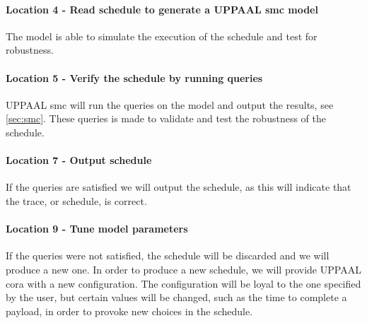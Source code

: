 \paragraph{Location 4 - Read schedule to generate a UPPAAL \gls{smc} model}
The model is able to simulate the execution of the schedule and test for robustness.

\paragraph{Location 5 - Verify the schedule by running queries} 
UPPAAL \gls{smc} will run the queries on the model and output the results, see \cref{sec:smc}. 
These queries is made to validate and test the robustness of the schedule.

\paragraph{Location 7 - Output schedule} 
If the queries are satisfied we will output the schedule, as this will indicate that the trace, or schedule, is correct.

\paragraph{Location 9 - Tune model parameters} 
If the queries were not satisfied, the schedule will be discarded and we will produce a new one. 
In order to produce a new schedule, we will provide UPPAAL \gls{cora} with a new configuration. 
The configuration will be loyal to the one specified by the user, but certain values will be changed, such as the time to complete a payload, in order to provoke new choices in the schedule. 